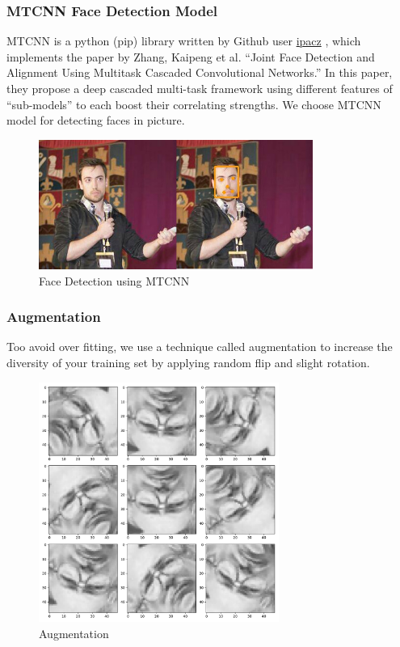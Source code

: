 \documentclass[11pt,a4paper]{article}
\begin{document}
    \subsubsection{MTCNN Face Detection Model}
    MTCNN is a python (pip) library written by Github user \href{https://github.com/ipazc/mtcnn}{ipacz} \cite{MTCNN}, which implements the paper by Zhang, Kaipeng et al. “Joint Face Detection and Alignment Using Multitask Cascaded Convolutional Networks.” \cite{1604.02878} In this paper, they propose a deep cascaded multi-task framework using different features of “sub-models” to each boost their correlating strengths. We choose MTCNN model for detecting faces in picture.
    \begin{figure}[H]
        \centering
        \includegraphics[width = 0.8\textwidth]{written_report/pictures/mtcnn.jpg}
        \caption{Face Detection using MTCNN}
        \label{fig:MTCNN}
    \end{figure}
    
    \subsubsection{Augmentation}
    Too avoid over fitting, we use a technique called augmentation to increase the diversity of your training set by applying random flip and slight rotation.
    \begin{figure}[H]
        \centering
        \includegraphics[width = 0.7\textwidth]{emotion_detection/plot/augmentation.pdf}
        \caption{Augmentation}
        \label{fig:augmentation}
    \end{figure}
    
\end{document}
